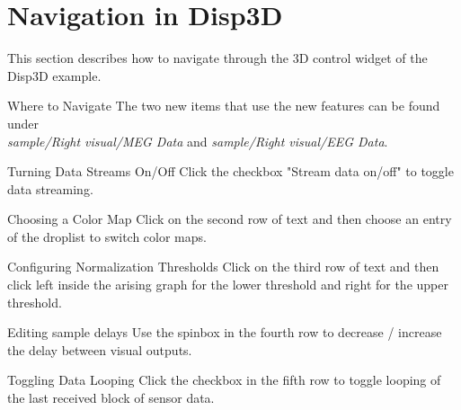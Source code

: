 \section{Navigation in Disp3D}

This section describes how to navigate through the 3D control widget of the Disp3D example.

\begin{aims}
	\item[\hspace*{10mm} Where to Navigate] The two new items that use the new features can be found under\\ \textit{sample/Right visual/MEG Data} and \textit{sample/Right visual/EEG Data}.
\end{aims}
	
	
\begin{aims}
	\item[\hspace*{10mm} Turning Data Streams On/Off] Click the checkbox "Stream data on/off" to toggle data streaming.
\end{aims}

\begin{aims}
	\item[\hspace*{10mm} Choosing a Color Map] Click on the second row of text and then choose an entry of the droplist to switch color maps.
\end{aims}

\begin{aims}
	\item[\hspace*{10mm} Configuring Normalization Thresholds] Click on the third row of text and then click left inside the arising graph for the lower threshold and right for the upper threshold.
\end{aims}

\begin{aims}
	\item[\hspace*{10mm} Editing sample delays] Use the spinbox in the fourth row to decrease / increase the delay between visual outputs. 
\end{aims}

\begin{aims}
	\item[\hspace*{10mm} Toggling Data Looping] Click the checkbox in the fifth row to toggle looping of the last received block of sensor data.
\end{aims}

